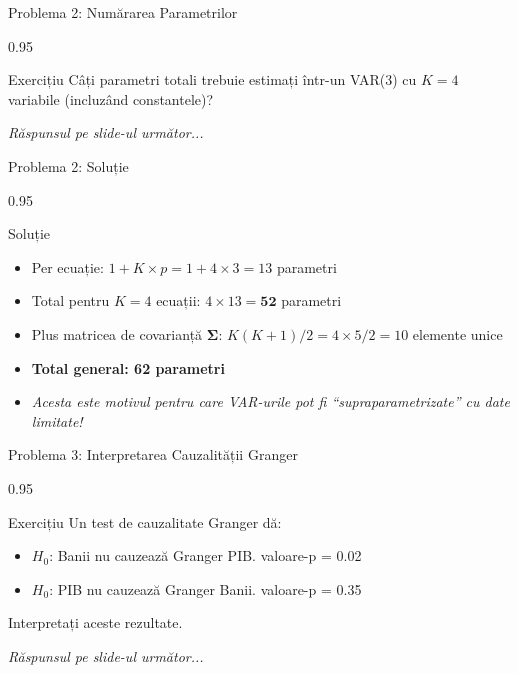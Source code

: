 \documentclass[9pt, aspectratio=169, t]{beamer}
\begin{document}
\begin{frame}{Problema 2: Numărarea Parametrilor}
    \begin{cminipage}{0.95\textwidth}
    \begin{block}{Exercițiu}
        Câți parametri totali trebuie estimați într-un VAR(3) cu $K=4$ variabile (incluzând constantele)?
    \end{block}

    \vspace{0.5cm}
    \begin{flushright}\textit{Răspunsul pe slide-ul următor...}\end{flushright}
    \end{cminipage}
\end{frame}

\begin{frame}{Problema 2: Soluție}
    \begin{cminipage}{0.95\textwidth}
    \begin{exampleblock}{Soluție}
        \begin{itemize}\setlength{\itemsep}{0pt}
            \item Per ecuație: $1 + K \times p = 1 + 4 \times 3 = 13$ parametri
            \item Total pentru $K=4$ ecuații: $4 \times 13 = \mathbf{52}$ parametri
            \item Plus matricea de covarianță $\boldsymbol{\Sigma}$: $K(K+1)/2 = 4 \times 5 / 2 = 10$ elemente unice
            \item \textbf{Total general: 62 parametri}
            \item \textit{Acesta este motivul pentru care VAR-urile pot fi ``supraparametrizate'' cu date limitate!}
        \end{itemize}
    \end{exampleblock}
    \end{cminipage}
\end{frame}

\begin{frame}{Problema 3: Interpretarea Cauzalității Granger}
    \begin{cminipage}{0.95\textwidth}
    \begin{block}{Exercițiu}
        Un test de cauzalitate Granger dă:
        \begin{itemize}\setlength{\itemsep}{0pt}
            \item $H_0$: Banii nu cauzează Granger PIB. valoare-p = 0.02
            \item $H_0$: PIB nu cauzează Granger Banii. valoare-p = 0.35
        \end{itemize}
        Interpretați aceste rezultate.
    \end{block}

    \vspace{0.5cm}
    \begin{flushright}\textit{Răspunsul pe slide-ul următor...}\end{flushright}
    \end{cminipage}
\end{frame}
\end{document}
